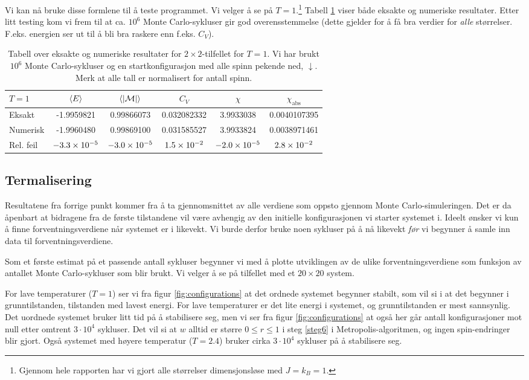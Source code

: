 \documentclass[11pt]{article}
\newcommand{\abs}[1]{|#1|}
\begin{document}
Vi kan nå bruke disse formlene til å teste programmet. Vi velger å se
på $T=1$.\footnote{Gjennom hele rapporten har vi gjort alle
  størrelser dimensjonsløse med $J=k_B=1$.} Tabell \ref{tab:2x2-eksakt-num} viser både eksakte og
numeriske resultater. Etter litt testing kom vi frem til at ca. $10^6$
Monte Carlo-sykluser gir god overensstemmelse (dette gjelder for å få
bra verdier for \textit{alle} størrelser. F.eks. energien ser ut til å bli bra
raskere enn f.eks. $C_V$).


\begin{table}
\centering
\caption{Tabell over eksakte og numeriske resultater for $2\times
  2$-tilfellet for $T=1$. Vi har brukt $10^6$ Monte Carlo-sykluser og
  en startkonfigurasjon med alle spinn pekende ned, $\downarrow$. Merk at
alle tall er normalisert for antall spinn.}
\label{tab:2x2-eksakt-num}
\vspace{0.1cm}
\begin{tabular}{l|ccccc}
$T=1$ & $\langle E \rangle$ & $\mean{ \abs{\mathcal{M} } }$ & $C_V$ & $\chi$ & $\chi_\text{abs}$ \\
\hline
Eksakt & -1.9959821 & 0.99866073 & 0.032082332 & 3.9933038 & 0.0040107395 \\
Numerisk & -1.9960480 & 0.99869100 & 0.031585527 & 3.9933824 & 0.0038971461 \\
Rel. feil & $-3.3\times 10^{-5}$ & $-3.0\times 10^{-5}$ & $1.5\times 10^{-2}$  & $-2.0\times 10^{-5}$ & $2.8\times 10^{-2}$ 
\end{tabular}
\end{table}



\subsection{Termalisering}
Resultatene fra forrige punkt kommer fra å ta gjennomsnittet av alle
verdiene som oppsto gjennom Monte Carlo-simuleringen. Det er da
åpenbart at bidragene fra de første tilstandene vil være avhengig av
den initielle konfigurasjonen vi starter systemet i. Ideelt ønsker vi
kun å finne forventningsverdiene når systemet er i likevekt. Vi burde
derfor bruke noen sykluser på å nå likevekt \textit{før} vi
begynner å samle inn data til forventningsverdiene. 

Som et første estimat på et passende antall sykluser begynner vi med å
plotte utviklingen av de ulike forventningsverdiene som funksjon av
antallet Monte Carlo-sykluser som blir brukt. Vi velger å se på
tilfellet med et $20\times 20$ system. 

For lave temperaturer ($T = 1$) ser vi fra figur \ref{fig:configurations} at det ordnede systemet
begynner stabilt, som vil si i at det begynner i grunntilstanden,
tilstanden med lavest energi. For lave temperaturer er det lite energi
i systemet, og grunntilstanden er mest sannsynlig. Det uordnede 
systemet bruker litt tid på å stabilisere seg, men vi ser fra
figur \ref{fig:configurations} at også her går antall konfigurasjoner mot null
etter omtrent $3 \cdot 10^4$ sykluser. Det vil si at $w$ alltid er
større $0\leq r\leq 1$ i steg \ref{steg6} i Metropolis-algoritmen,
og ingen spin-endringer blir gjort. Også systemet med høyere
temperatur ($T=2.4$) bruker cirka $3 \cdot 10^4$ sykluser på å
stabilisere seg.
\end{document}
